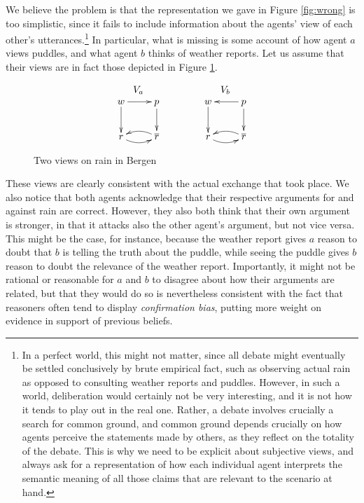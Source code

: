 \documentclass[greybox]{svmult}
\renewcommand{\bar}[1]{\overline{#1}}
\begin{document}
We believe the problem is that the representation we gave in Figure \ref{fig:wrong} is too simplistic, since it fails to include information about the agents' view of each other's utterances.\footnote{In a perfect world, this might not matter, since all debate might eventually be settled conclusively by brute empirical fact, such as observing actual rain as opposed to consulting weather reports and puddles. However, in such a world, deliberation would certainly not be very interesting, and it is not how it tends to play out in the real one. Rather, a debate involves crucially a search for common ground, and common ground depends crucially on how agents perceive the statements made by others, as they reflect on the totality of the debate. This is why we need to be explicit about subjective views, and always ask for a representation of how each individual agent interprets the semantic meaning of all those claims that are relevant to the scenario at hand.}
In particular, what is missing is some account of how agent $a$ views puddles, and what agent $b$ thinks of weather reports. Let us assume that their views are in fact those depicted in Figure \ref{rainview}.
\begin{figure}
$$\begin{array}{cc}
V_{a} \hspace{3em} & V_{b} \\
\xymatrix{ w \ar[d] \ar[r] & p \ar[d] \\ r \ar@/_/[r] & \bar r \ar@/_/[l] } \hspace{3em} &
\xymatrix{w \ar[d] & p \ar[d] \ar[l] \\ r \ar@/_/[r] & \bar r \ar@/_/[l] }
\end{array}$$
\caption{Two views on rain in Bergen}
\label{rainview}
\end{figure}
These views are clearly consistent with the actual exchange that took place. We also notice that both agents acknowledge that their respective arguments for and against rain are correct. However, they also both think that their own argument is stronger, in that it attacks also the other agent's argument, but not vice versa. This might be the case, for instance, because the weather report gives $a$ reason to doubt that $b$ is telling the truth about the puddle, while seeing the puddle gives $b$ reason to doubt the relevance of the weather report. Importantly, it might not be rational or reasonable for $a$ and $b$ to disagree about how their arguments are related, but that they would do so is nevertheless consistent with the fact that reasoners often tend to display \emph{confirmation bias}, putting more weight on evidence in support of previous beliefs.
\end{document}
